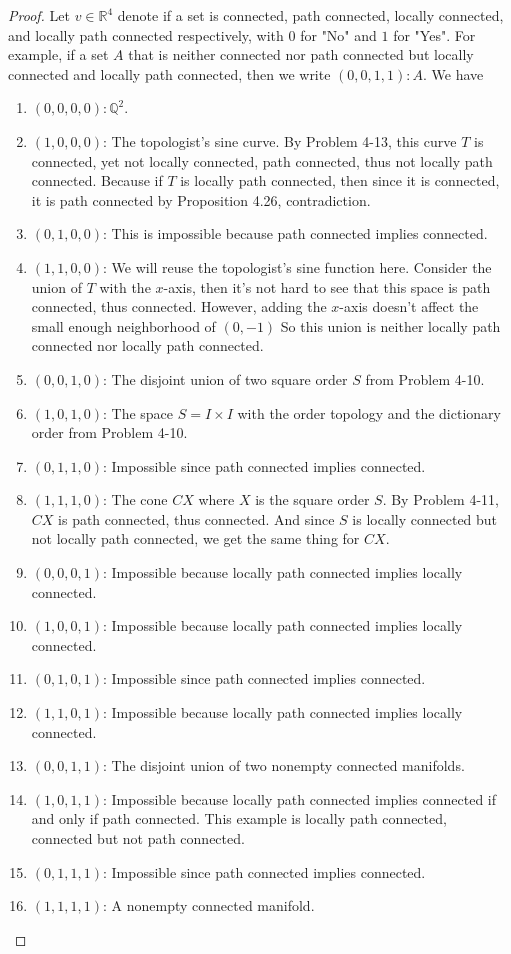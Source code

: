 \documentclass[12pt, a4paper]{article}
\theoremstyle{plain}
\newcommand{\Q}{\mathbb{Q}}
\newcommand{\R}{\mathbb{R}}
\begin{document}
	\begin{proof}
	Let $v\in \R^4$ denote if a set is connected, path connected, locally connected, and locally path connected respectively, with $0$ for "No" and $1$ for "Yes". For example, if a set $A$ that is neither connected nor path connected but locally connected and locally path connected, then we write $(0,0,1,1):A$. We have
	\begin{enumerate}[label=(\roman*)]
	\item $(0,0,0,0):\Q^2$. 
	\item $(1,0,0,0)$: The topologist's sine curve. By Problem 4-13, this curve $T$ is connected, yet not locally connected, path connected, thus not locally path connected. Because if $T$ is locally path connected, then since it is connected, it is path connected by Proposition 4.26, contradiction.
	\item $(0,1,0,0)$: This is impossible because path connected implies connected.
	\item $(1,1,0,0)$: We will reuse the topologist's sine function here. Consider the union of $T$ with the $x$-axis, then it's not hard to see that this space is path connected, thus connected. However, adding the $x$-axis doesn't affect the small enough neighborhood of $(0,-1)$ So this union is neither locally path connected nor locally path connected.
	\item $(0,0,1,0)$: The disjoint union of two square order $S$ from Problem 4-10.
	
	\item $(1,0,1,0)$: The space $S = I\times I$ with the order topology and the dictionary order from Problem 4-10.
	\item $(0,1,1,0)$: Impossible since path connected implies connected.
	\item $(1,1,1,0)$: The cone $CX$ where $X$ is the square order $S$. By Problem 4-11, $CX$ is path connected, thus connected. And since $S$ is locally connected but not locally path connected, we get the same thing for $CX$.
	\item $(0,0,0,1)$: Impossible because locally path connected implies locally connected.
	\item $(1,0,0,1)$: Impossible because locally path connected implies locally connected.
	\item $(0,1,0,1)$: Impossible since path connected implies connected.
	\item $(1,1,0,1)$: Impossible because locally path connected implies locally connected.
	\item $(0,0,1,1)$: The disjoint union of two nonempty connected manifolds.
	\item $(1,0,1,1)$: Impossible because locally path connected implies connected if and only if path connected. This example is locally path connected, connected but not path connected.
	\item $(0,1,1,1)$: Impossible since path connected implies connected.
	\item $(1,1,1,1)$: A nonempty connected manifold.
	\end{enumerate}
	\end{proof}
	
\end{document}
